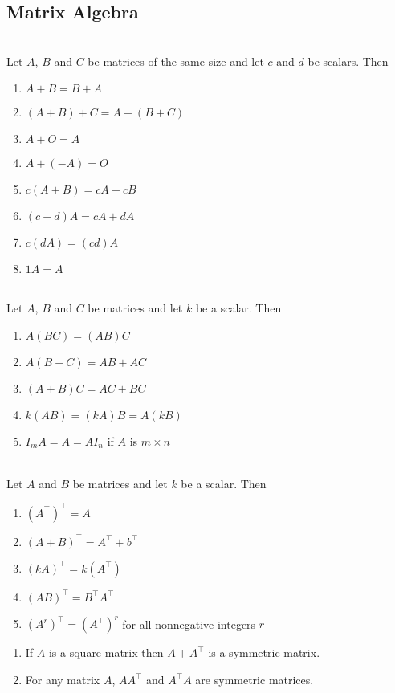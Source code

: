 \documentclass{article}
\begin{document}
\subsection{Matrix Algebra}
\begin{theorem}
    \\
    Let $A$, $B$ and $C$ be matrices of the same size and let $c$ and $d$ be scalars. Then
    \begin{enumerate}
        \item $A+B=B+A$
        \item $(A+B)+C=A+(B+C)$
        \item $A+O=A$
        \item $A+(-A)=O$
        \item $c(A+B)=cA + cB$
        \item $(c+d)A = cA+dA$
        \item $c(dA) = (cd)A$
        \item $1A=A$
    \end{enumerate}
\end{theorem}
\begin{theorem}
    \\
    Let $A$, $B$ and $C$ be matrices and let $k$ be a scalar. Then
    \begin{enumerate}
        \item $A(BC) = (AB)C$
        \item $A(B+C) = AB + AC$
        \item $(A + B)C = AC + BC$
        \item $k(AB) = (kA)B = A(kB)$
        \item $I_mA=A=AI_n$ if $A$ is $m\times n$
    \end{enumerate}
\end{theorem}
\begin{theorem}
    \\
    Let $A$ and $B$ be matrices and let $k$ be a scalar. Then
    \begin{enumerate}
        \item $(A^\intercal)^\intercal = A$
        \item $(A+B)^\intercal = A^\intercal + b^\intercal$
        \item $(kA)^\intercal = k(A^\intercal)$
        \item $(AB)^\intercal = B^\intercal A^\intercal$
        \item $(A^r)^\intercal = (A^\intercal)^r$ for all nonnegative integers $r$
    \end{enumerate}
\end{theorem}
\begin{theorem}
    \begin{enumerate}
        \item If $A$ is a square matrix then $A+A^\intercal$ is a symmetric matrix.
        \item For any matrix $A$, $AA^\intercal$ and $A^\intercal A$ are symmetric matrices.
    \end{enumerate}
\end{theorem}
\end{document}
